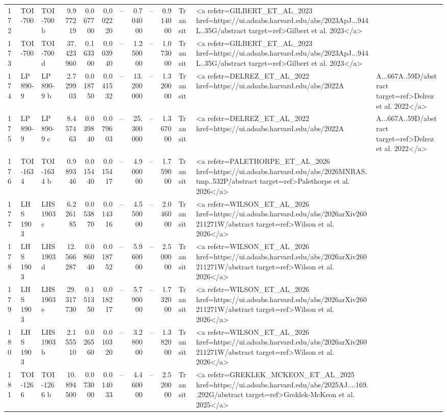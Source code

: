 \begin{tabular}{lllrrrrrrrll}
172 & TOI-700 & TOI-700 b & 9.977219 & 0.067700 & 0.002220 & -- & 0.704000 & -- & 0.914000 & Transit & <a refstr=GILBERT_ET_AL_2023 href=https://ui.adsabs.harvard.edu/abs/2023ApJ...944L..35G/abstract target=ref>Gilbert et al. 2023</a> \\
173 & TOI-700 & TOI-700 d & 37.423960 & 0.163300 & 0.003940 & -- & 1.250000 & -- & 1.073000 & Transit & <a refstr=GILBERT_ET_AL_2023 href=https://ui.adsabs.harvard.edu/abs/2023ApJ...944L..35G/abstract target=ref>Gilbert et al. 2023</a> \\
174 & LP 890-9 & LP 890-9 b & 2.729903 & 0.018750 & 0.041532 & -- & 13.200000 & -- & 1.320000 & Transit & <a refstr=DELREZ_ET_AL_2022 href=https://ui.adsabs.harvard.edu/abs/2022A&A...667A..59D/abstract target=ref>Delrez et al. 2022</a> \\
175 & LP 890-9 & LP 890-9 c & 8.457463 & 0.039840 & 0.079603 & -- & 25.300000 & -- & 1.367000 & Transit & <a refstr=DELREZ_ET_AL_2022 href=https://ui.adsabs.harvard.edu/abs/2022A&A...667A..59D/abstract target=ref>Delrez et al. 2022</a> \\
176 & TOI-1634 & TOI-1634 b & 0.989346 & 0.015440 & 0.015417 & -- & 4.900000 & -- & 1.759000 & Transit & <a refstr=PALETHORPE_ET_AL_2026 href=https://ui.adsabs.harvard.edu/abs/2026MNRAS.tmp..532P/abstract target=ref>Palethorpe et al. 2026</a> \\
177 & LHS 1903 & LHS 1903 c & 6.226185 & 0.053870 & 0.014316 & -- & 4.550000 & -- & 2.046000 & Transit & <a refstr=WILSON_ET_AL_2026 href=https://ui.adsabs.harvard.edu/abs/2026arXiv260211271W/abstract target=ref>Wilson et al. 2026</a> \\
178 & LHS 1903 & LHS 1903 d & 12.566287 & 0.086040 & 0.018752 & -- & 5.960000 & -- & 2.500000 & Transit & <a refstr=WILSON_ET_AL_2026 href=https://ui.adsabs.harvard.edu/abs/2026arXiv260211271W/abstract target=ref>Wilson et al. 2026</a> \\
179 & LHS 1903 & LHS 1903 e & 29.317730 & 0.151350 & 0.018217 & -- & 5.790000 & -- & 1.732000 & Transit & <a refstr=WILSON_ET_AL_2026 href=https://ui.adsabs.harvard.edu/abs/2026arXiv260211271W/abstract target=ref>Wilson et al. 2026</a> \\
180 & LHS 1903 & LHS 1903 b & 2.155510 & 0.026560 & 0.010320 & -- & 3.280000 & -- & 1.382000 & Transit & <a refstr=WILSON_ET_AL_2026 href=https://ui.adsabs.harvard.edu/abs/2026arXiv260211271W/abstract target=ref>Wilson et al. 2026</a> \\
181 & TOI-1266 & TOI-1266 b & 10.894500 & 0.073000 & 0.014033 & -- & 4.460000 & -- & 2.520000 & Transit & <a refstr=GREKLEK_MCKEON_ET_AL_2025 href=https://ui.adsabs.harvard.edu/abs/2025AJ....169..292G/abstract target=ref>Greklek-McKeon et al. 2025</a> \\

\end{tabular}
